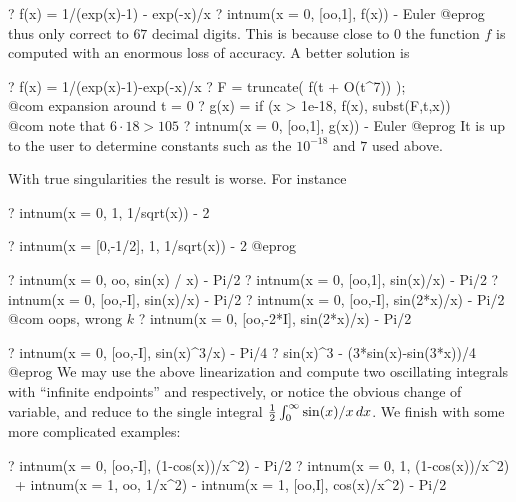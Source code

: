 \bprog
? f(x) = 1/(exp(x)-1) - exp(-x)/x
? intnum(x = 0, [oo,1],  f(x)) - Euler
@eprog\noindent
thus only correct to $67$ decimal digits. This is because close to $0$ the
function $f$ is computed with an enormous loss of accuracy.
A better solution is

\bprog
? f(x) = 1/(exp(x)-1)-exp(-x)/x
? F = truncate( f(t + O(t^7)) ); \\@com expansion around t = 0
? g(x) = if (x > 1e-18, f(x), subst(F,t,x))  \\@com note that $6 \cdot 18 > 105$
? intnum(x = 0, [oo,1],  g(x)) - Euler
@eprog\noindent
It is up to the user to determine constants such as the $10^{-18}$ and $7$
used above.

 With true singularities the result is worse.
For instance

\bprog
? intnum(x = 0, 1,  1/sqrt(x)) - 2

? intnum(x = [0,-1/2], 1,  1/sqrt(x)) - 2
@eprog


\bprog
? intnum(x = 0, oo, sin(x) / x) - Pi/2
? intnum(x = 0, [oo,1], sin(x)/x) - Pi/2
? intnum(x = 0, [oo,-I], sin(x)/x) - Pi/2
? intnum(x = 0, [oo,-I], sin(2*x)/x) - Pi/2  \\@com oops, wrong $k$
? intnum(x = 0, [oo,-2*I], sin(2*x)/x) - Pi/2

? intnum(x = 0, [oo,-I], sin(x)^3/x) - Pi/4
? sin(x)^3 - (3*sin(x)-sin(3*x))/4
@eprog\noindent
We may use the above linearization and compute two oscillating integrals with
``infinite endpoints'' \kbd{[oo, -I]} and \kbd{[oo, -3*I]} respectively, or
notice the obvious change of variable, and reduce to the single integral
${1\over 2}\int_0^\infty \sin(x)/x\,dx$. We finish with some more complicated
examples:

\bprog
? intnum(x = 0, [oo,-I], (1-cos(x))/x^2) - Pi/2
? intnum(x = 0, 1, (1-cos(x))/x^2) \
+ intnum(x = 1, oo, 1/x^2) - intnum(x = 1, [oo,I], cos(x)/x^2) - Pi/2

